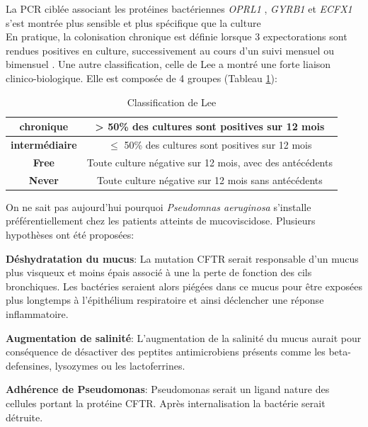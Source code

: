 \documentclass[12pt,a4paper]{article}
\begin{document}
La PCR ciblée associant les protéines bactériennes \textit{OPRL1} , \textit{GYRB1} et \textit{ECFX1}  s’est montrée plus sensible et plus spécifique que la culture\cite{LeGall} \\
En pratique, la colonisation chronique est définie lorsque 3 expectorations sont rendues positives en culture, successivement au cours d’un suivi mensuel ou bimensuel \cite{LeBourgeois}.
Une autre classification, celle de Lee\cite{Lee2003} a montré une forte liaison clinico-biologique. Elle est composée de 4 groupes (Tableau \ref{lee}):  

 \begin{table}[h]
     \centering
     \begin{tabular}{|c|c|}
      \hline 
          \textbf{chronique} & > 50\% des cultures sont positives sur 12 mois \\
         \hline 
         \textbf{intermédiaire} & $\leq$ 50\% des cultures sont positives sur  12 mois\\
          \hline 
          \textbf{Free} & Toute culture négative sur 12 mois, avec des antécédents\\
         \hline 	     
	    \textbf{Never} &Toute culture négative sur 12 mois sans antécédents \\
	      \hline  
     \end{tabular}
     \caption{Classification de Lee \cite{Lee2003}}
     \label{lee}
 \end{table}


On ne sait pas aujourd’hui pourquoi \textit{Pseudomnas aeruginosa} s’installe préférentiellement chez les patients atteints de mucoviscidose. Plusieurs hypothèses ont été proposées:

\textbf{Déshydratation du mucus}\cite{Davies}:
La mutation CFTR serait responsable d'un mucus plus visqueux et moins épais associé à une la perte de fonction des cils bronchiques. Les bactéries seraient alors piégées dans ce mucus pour être exposées plus longtemps à l'épithélium respiratoire et ainsi déclencher une réponse inflammatoire. 

\textbf{Augmentation de salinité}\cite{Davies}:
L'augmentation de la salinité du mucus aurait pour conséquence de désactiver des peptites antimicrobiens présents comme les beta-defensines, lysozymes ou les lactoferrines.

\textbf{Adhérence de Pseudomonas}\cite{Davies}:
Pseudomonas serait un ligand nature des cellules portant la protéine CFTR. Après internalisation la bactérie serait détruite. 
\end{document}
